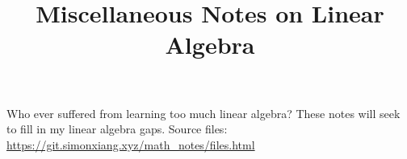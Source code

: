 \documentclass[fontsize=9pt]{article}
\title{Miscellaneous Notes on Linear Algebra}
\begin{document}
\maketitle
Who ever suffered from learning too much linear algebra? These notes will seek to fill in my linear algebra gaps. Source files: \url{https://git.simonxiang.xyz/math_notes/files.html}
\tableofcontents
\newpage
    
\end{document}
